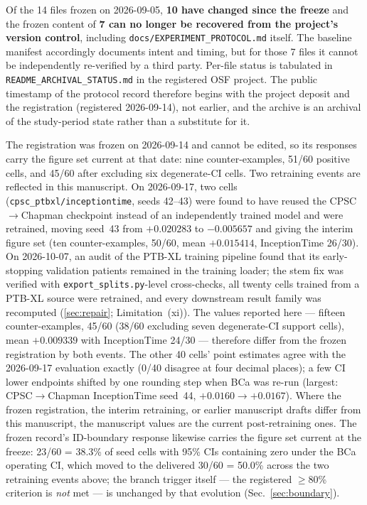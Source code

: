 \documentclass[final,5p,times,nonatbib]{elsarticle}
\begin{document}
Of the 14 files frozen on 2026-09-05, \textbf{10 have changed since the
freeze} and the frozen content of \textbf{7 can no longer be recovered from
the project's version control}, including \texttt{docs/EXPERIMENT\_PROTOCOL.md}
itself. The baseline manifest accordingly documents intent and timing, but
for those 7 files it cannot be independently re-verified by a third party.
Per-file status is tabulated in \texttt{README\_ARCHIVAL\_STATUS.md} in the
registered OSF project. The public timestamp of the protocol record
therefore begins with the project deposit and the registration
(registered 2026-09-14), not earlier, and the archive is an archival of the
study-period state rather than a substitute for it.

The registration was frozen on 2026-09-14 and cannot be edited, so its
responses carry the figure set current at that date: nine counter-examples,
51/60 positive cells, and 45/60 after excluding six degenerate-CI cells.
Two retraining events are reflected in this manuscript. On 2026-09-17, two
cells (\texttt{cpsc\_ptbxl/inceptiontime}, seeds 42--43) were found to have
reused the CPSC$\rightarrow$Chapman checkpoint instead of an independently
trained model and were retrained, moving seed~43 from $+0.020283$ to
$-0.005657$ and giving the interim figure set (ten counter-examples, 50/60,
mean $+0.015414$, InceptionTime 26/30). On 2026-10-07, an audit of the
PTB-XL training pipeline found that its early-stopping validation patients
remained in the training loader; the stem fix was verified with
\texttt{export\_splits.py}-level cross-checks, all twenty cells trained
from a PTB-XL source were retrained, and every downstream result family
was recomputed (\ref{sec:repair}; Limitation~(xi)). The
values reported here --- fifteen counter-examples, 45/60 (38/60 excluding
seven degenerate-CI support cells), mean $+0.009339$ with InceptionTime
24/30 --- therefore differ from the frozen registration by both events.
The other 40 cells' point estimates agree with the 2026-09-17 evaluation
exactly (0/40 disagree at four decimal places); a few CI lower endpoints
shifted by one rounding step when BCa was re-run (largest:
CPSC$\rightarrow$Chapman InceptionTime seed~44, $+0.0160\rightarrow+0.0167$).
Where the frozen registration, the interim retraining, or earlier
manuscript drafts differ from this manuscript, the manuscript values are
the current post-retraining ones. The frozen record's ID-boundary
response likewise carries the figure set current at the freeze:
23/60 = 38.3\% of seed cells with 95\% CIs containing zero under the
BCa operating CI, which moved to the delivered 30/60 = 50.0\% across
the two retraining events above; the branch trigger itself --- the
registered $\geq$80\% criterion is \emph{not} met --- is unchanged by
that evolution (Sec.~\ref{sec:boundary}).
\end{document}
